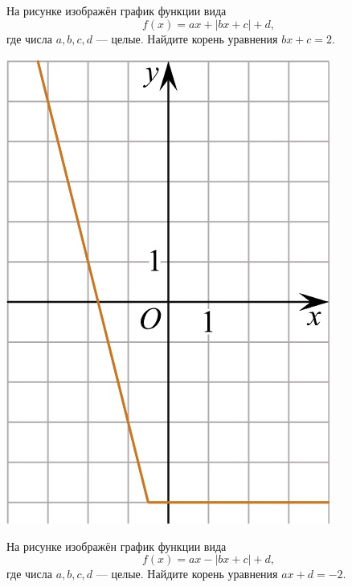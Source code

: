 \begin{consultation}
\begin{listofex}
\begin{minipage}[t]{\picwidth}
		\end{minipage}
		\item
		\begin{minipage}[t]{\bodywidth}
			На рисунке изображён график функции вида \[ f(x)=ax+|bx+c|+d, \] где числа \(a, b, c, d\) --- целые. Найдите корень уравнения \(bx+c=2\).
		\end{minipage}
		\hspace{0.02\linewidth}
		\begin{minipage}[t]{\picwidth}
			\includegraphics[align=t, width=\linewidth]{../pics/G101M4H2-6.jpg}
		\end{minipage}
		\item
		\begin{minipage}[t]{\bodywidth}
			На рисунке изображён график функции вида \[ f(x)=ax-|bx+c|+d, \] где числа \(a, b, c, d\) --- целые. Найдите корень уравнения \(ax+d=-2\).

\end{minipage}
\end{listofex}
\end{consultation}
